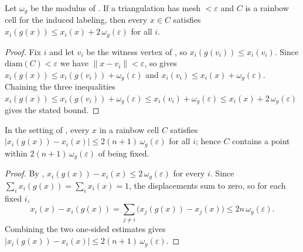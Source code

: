 \begin{lemma}
    \label{lem:rainbow-one-sided}
    Let $\omega_g$ be the modulus of . If a
    triangulation has mesh $< \varepsilon$ and $C$ is a rainbow cell for the
    induced labeling, then every $x \in C$ satisfies
    $x_i(g(x)) \le x_i(x) + 2\,\omega_g(\varepsilon)$ for all $i$.
\end{lemma}
\begin{proof}
    Fix $i$ and let $v_i$ be the witness vertex of ,
    so $x_i(g(v_i)) \le x_i(v_i)$. Since $\mathrm{diam}(C) < \varepsilon$ we have
    $\lVert x - v_i \rVert < \varepsilon$, so  gives
    $x_i(g(x)) \le x_i(g(v_i)) + \omega_g(\varepsilon)$ and
    $x_i(v_i) \le x_i(x) + \omega_g(\varepsilon)$. Chaining the three inequalities
    $x_i(g(x)) \le x_i(g(v_i)) + \omega_g(\varepsilon)
      \le x_i(v_i) + \omega_g(\varepsilon)
      \le x_i(x) + 2\,\omega_g(\varepsilon)$ gives the stated bound.
\end{proof}

\begin{lemma}
    \label{lem:rainbow-approx-fixed}
    In the setting of , every $x$ in a rainbow cell
    $C$ satisfies
    $|x_i(g(x)) - x_i(x)| \le 2(n+1)\,\omega_g(\varepsilon)$ for all $i$; hence
    $C$ contains a point within $2(n+1)\,\omega_g(\varepsilon)$ of being fixed.
\end{lemma}
\begin{proof}
    By , $x_i(g(x)) - x_i(x) \le 2\,\omega_g(\varepsilon)$
    for every $i$. Since $\sum_i x_i(g(x)) = \sum_i x_i(x) = 1$, the displacements
    sum to zero, so for each fixed $i$,
    \[
        x_i(x) - x_i(g(x)) = \sum_{j \ne i}\bigl(x_j(g(x)) - x_j(x)\bigr)
        \le 2n\,\omega_g(\varepsilon).
    \]
    Combining the two one-sided estimates gives
    $|x_i(g(x)) - x_i(x)| \le 2(n+1)\,\omega_g(\varepsilon)$.
\end{proof}

